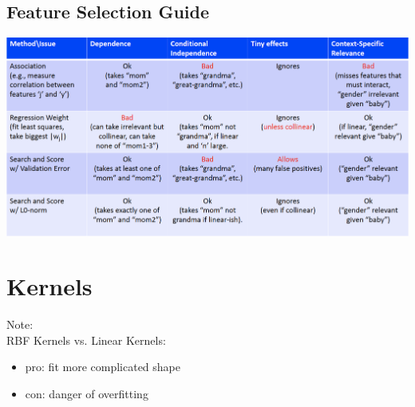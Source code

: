 \documentclass[10pt,landscape,a4paper]{article}
\begin{document}
\begin{multicols*}{5}
\subsection{Feature Selection Guide}
\includegraphics[scale=0.1]{feature_selection_guide}

\section{Kernels}

Note: \\
RBF Kernels vs. Linear Kernels:
\begin{itemize}
    \item pro: fit more complicated shape
    \item con: danger of overfitting
\end{itemize}


\end{multicols*}
\end{document}
